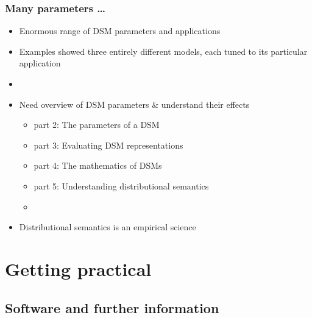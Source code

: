 \documentclass[t]{beamer} %
\begin{document}
\begin{frame}
  \frametitle{Many parameters \ldots}

  \begin{itemize}
  \item Enormous range of DSM parameters and applications
  \item Examples showed three entirely different models, each tuned to
    its particular application
  \item[]
  \item<2->[\So] Need overview of DSM parameters \& understand their effects
    \begin{itemize}
    \item part 2: The parameters of a DSM
    \item part 3: Evaluating DSM representations
    \item part 4: The mathematics of DSMs
    \item part 5: Understanding distributional semantics
    \item[]
    \end{itemize}
  \item<3->[\So] Distributional semantics is an empirical science
  \end{itemize}
\end{frame}

\section{Getting practical}

\subsection{Software and further information}
\end{document}

